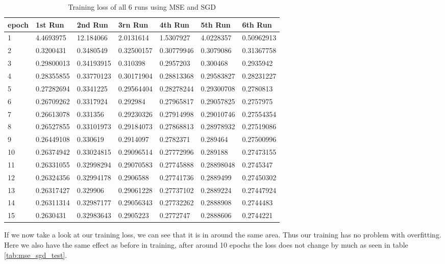 \begin{table}[!ht]
    \centering
    \begin{tabular}{|l||l||l||l||l||l||l|}
    \hline
        epoch & 1st Run & 2nd Run & 3rn Run & 4th Run & 5th Run & 6th Run \\ \hline
        1 & 4.4693975 & 12.184066 & 2.0131614 & 1.5307927 & 4.0228357 & 0.50962913 \\ \hline
        2 & 0.3200431 & 0.3480549 & 0.32500157 & 0.30779946 & 0.3079086 & 0.31367758 \\ \hline
        3 & 0.29800013 & 0.34193915 & 0.310398 & 0.2957203 & 0.300468 & 0.2935942 \\ \hline
        4 & 0.28355855 & 0.33770123 & 0.30171904 & 0.28813368 & 0.29583827 & 0.28231227 \\ \hline
        5 & 0.27282694 & 0.3341225 & 0.29564404 & 0.28278244 & 0.29300708 & 0.2780813 \\ \hline
        6 & 0.26709262 & 0.3317924 & 0.292984 & 0.27965817 & 0.29057825 & 0.2757975 \\ \hline
        7 & 0.26613078 & 0.331356 & 0.29230326 & 0.27914998 & 0.29010746 & 0.27554354 \\ \hline
        8 & 0.26527855 & 0.33101973 & 0.29184073 & 0.27868813 & 0.28978932 & 0.27519086 \\ \hline
        9 & 0.26449108 & 0.330619 & 0.2914097 & 0.2782371 & 0.289464 & 0.27500996 \\ \hline
        10 & 0.26374942 & 0.33024815 & 0.29096514 & 0.27772996 & 0.289188 & 0.27473155 \\ \hline
        11 & 0.26331055 & 0.32998294 & 0.29070583 & 0.27745888 & 0.28898048 & 0.2745347 \\ \hline
        12 & 0.26324356 & 0.32994178 & 0.2906588 & 0.27741736 & 0.2889499 & 0.27450302 \\ \hline
        13 & 0.26317427 & 0.329906 & 0.29061228 & 0.27737102 & 0.2889224 & 0.27447924 \\ \hline
        14 & 0.26311314 & 0.32987177 & 0.29056343 & 0.27732262 & 0.2888908 & 0.2744483 \\ \hline
        15 & 0.2630431 & 0.32983643 & 0.2905223 & 0.2772747 & 0.2888606 & 0.2744221 \\ \hline
    \end{tabular}
    \caption{\label{tab:mse_sgd_train}Training loss of all 6 runs using MSE and SGD}
\end{table}

If we now take a look at our training loss, we can see that it is in around the same area. Thus our training
has no problem with overfitting. Here we also have the same effect as before in training, after around 10 epochs 
the loss does not change by much as seen in table \ref{tab:mse_sgd_test}.


